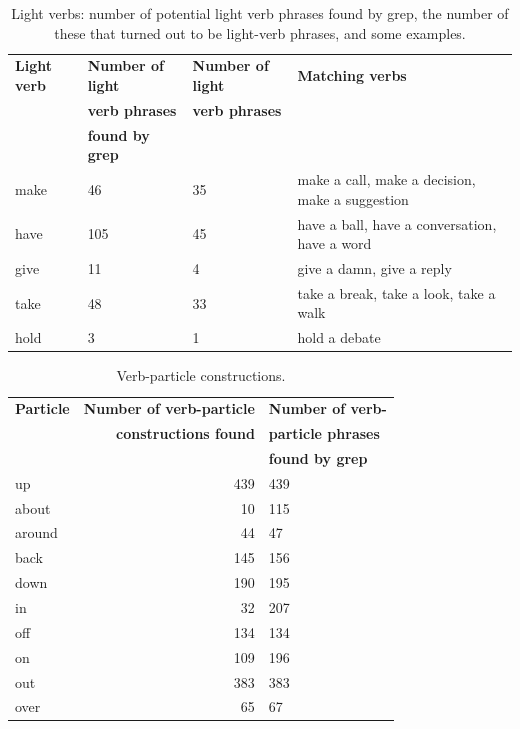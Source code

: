 \documentclass[11pt]{article}
\begin{document}
\begin{itemize}
\begin{center}
\begin{table}
\hfill{}
\begin{tabular}{|l|l|l|l|}
\hline \bf Light verb & \bf Number of light & \bf Number of light & \bf Matching verbs\\ 
 & \bf verb phrases & \bf verb phrases & \\ 
 & \bf  found by grep & & \\ \hline
make & 46 & 35 & make a call, make a decision, make a suggestion\\
have & 105 & 45 & have a ball, have a conversation, have a word\\
give & 11 & 4 & give a damn, give a reply\\
take & 48 & 33 & take a break, take a look, take a walk\\
hold & 3 & 1 & hold a debate\\
\hline
\end{tabular}
\hfill{}
\caption{Light verbs: number of potential light verb phrases found by grep, the number of these that turned out to be light-verb phrases, and some examples. }
\label{light-verbs}
\end{table}
\end{center}

\begin{table}[h]
\begin{center}
\begin{tabular}{|l|r|l|}
\hline \bf Particle & \bf Number of verb-particle  & \bf Number of verb-\\ 
 & \bf constructions found & \bf  particle phrases \\ 
& & \bf found by grep \\ \hline
up & 439 & 439 \\
about & 10 & 115 \\
around & 44 & 47 \\
back & 145 & 156 \\
down & 190 & 195 \\
in & 32 & 207 \\
off & 134 & 134 \\
on & 109 & 196 \\
out & 383 & 383 \\
over & 65 & 67 \\
\hline
\end{tabular}
\end{center}
\caption{\label{font-table} Verb-particle constructions. }
\end{table}


\end{itemize}
\end{document}
